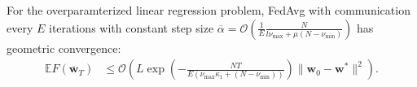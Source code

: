 \begin{comment}
In general $H$ has zero eigenvalues. However, because the null space
of $H$ and range of $H$ are orthogonal, in our subsequence analysis
it suffices to project $\overline{\mathbf{w}}_{t}-\mathbf{w}^{\ast}$
onto the range of $H$, thus we may restrict to the non-zero eigenvalue
of $H$. We can use $\mathbf{w}^{\ast T}\mathbf{x}_{k}^{j}-z_{k}^{j}\equiv0$
to rewrite the local objectives as $F_{k}(\mathbf{w})=\frac{1}{2}\langle\mathbf{w}-\mathbf{w}^{\ast},H^{k}(\mathbf{w}-\mathbf{w}^{\ast})\rangle\equiv\frac{1}{2}\|\mathbf{w}-\mathbf{w}^{\ast}\|_{H^{k}}^{2}$
so that $F(\mathbf{w})=\frac{1}{2}\|\mathbf{w}-\mathbf{w}^{\ast}\|_{H}^{2}$.
\end{comment}
\begin{comment}
\begin{align*}
F_{k}(w) & =\frac{1}{2n_{k}}\sum_{j=1}^{n_{k}}(w^{T}x_{k,j}-z_{k,j}-(w^{\ast T}x_{k,j}-z_{k,j}))^{2}=\frac{1}{2n_{k}}\sum_{j=1}^{n_{k}}((w-w^{\ast})^{T}x_{k,j})^{2}\\
& =\frac{1}{2}\langle w-w^{\ast},H^{k}(w-w^{\ast})\rangle=\frac{1}{2}\|w-w^{\ast}\|_{H^{k}}^{2}
\end{align*}
\end{comment}
\begin{comment}
Let $\xi_{t}^{k}$ be the stochastic sample on the $k$th device at
time $t$, and define $\tilde{H}_{t}^{k}:=\xi_{t}^{k}(\xi_{t}^{k})^{T}$
as the stochastic Hessian matrix. %
\end{comment}
\begin{comment}
Note that $\mathbb{E}\tilde{H}_{t}^{k}=\frac{1}{n_{k}}\sum_{j=1}^{n_{k}}\mathbf{x}_{k}^{j}(\mathbf{x}_{k}^{j})^{T}=H^{k}$
and $\mathbf{g}_{t,k}=\nabla F_{k}(\mathbf{w}_{t}^{k},\xi_{t}^{k})=\tilde{H}_{t}^{k}(\mathbf{w}_{t}^{k}-\mathbf{w}^{\ast})$
while $\mathbf{g}_{t}=\sum_{k=1}^{N}p_{k}\nabla F_{k}(\mathbf{w}_{t}^{k},\xi_{t}^{k})=\sum_{k=1}^{N}p_{k}\tilde{H}_{t}^{k}(\mathbf{w}_{t}^{k}-\mathbf{w}^{\ast})$.
\end{comment}

\begin{theorem}
	\label{thm:overparameterized_quadratic}For the overparamterized linear regression problem, FedAvg with communication every $E$
	iterations with constant step size $\overline{\alpha}=\mathcal{O}(\frac{1}{E}\frac{N}{l\nu_{\max}+\mu(N-\nu_{\min})})$
	has geometric convergence:
	\begin{align*}
	\mathbb{E}F(\overline{\mathbf{w}}_{T}) & \leq\mathcal{O}\left(L\exp(-\frac{NT}{E(\nu_{\max}\kappa_{1}+(N-\nu_{\min}))})\|\mathbf{w}_{0}-\mathbf{w}^{\ast}\|^{2}\right).
	\end{align*}
\end{theorem}

